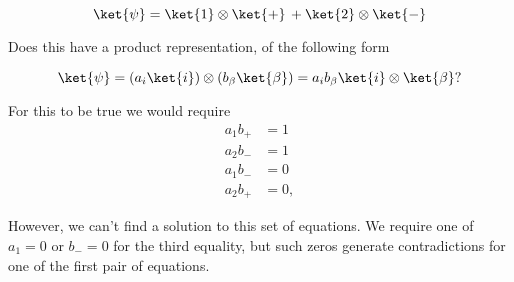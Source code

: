 \begin{equation}\label{eqn:entangledSimpleExample:50}
\ket{\psi} = \ket{1} \otimes \ket{+} \,+ \ket{2} \otimes \ket{-}
\end{equation}

Does this have a product representation, of the following form

\begin{equation}\label{eqn:entangledSimpleExample:70}
\ket{\psi} = (a_{i} \ket{i}) \otimes (b_{\beta} \ket{\beta}) = a_{i} b_{\beta} \ket{i} \otimes \ket{\beta}?
\end{equation}

For this to be true we would require
\begin{align*}
a_1 b_{+} &= 1 \\
a_2 b_{-} &= 1 \\
a_1 b_{-} &= 0 \\
a_2 b_{+} &= 0,
\end{align*}

However, we can't find a solution to this set of equations.  We require one of $a_1 = 0$ or $b_{-} = 0$ for the third equality, but such zeros generate contradictions for one of the first pair of equations.

\EndNoBibArticle
